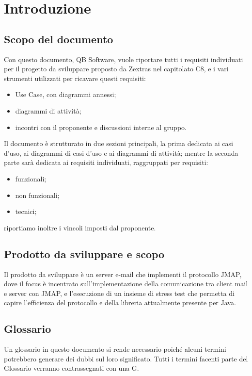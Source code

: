 \section{Introduzione}
    	\subsection{Scopo del documento}
            Con questo documento, QB Software, vuole riportare tutti i requisiti individuati per il progetto da sviluppare proposto da Zextras nel capitolato C8, e i vari strumenti utilizzati per ricavare questi requisiti:
            \begin{itemize}
                \item Use Case, con diagrammi annessi;
                \item diagrammi di attività;
                \item incontri con il proponente e discussioni interne al gruppo.
            \end{itemize} 
            Il documento è strutturato in due sezioni principali, la prima dedicata ai casi d'uso, ai diagrammi di casi d'uso e ai diagrammi di attività; mentre la seconda parte sarà dedicata ai requisiti individuati, raggruppati per requisiti:
            \begin{itemize}
                \item funzionali;
                \item non funzionali;
                \item tecnici;
            \end{itemize}
            riportiamo inoltre i vincoli imposti dal proponente.
    
    	\subsection{Prodotto da sviluppare e scopo}
            Il prodotto da sviluppare è un server e-mail che implementi il protocollo JMAP, dove il focus è incentrato sull'implementazione della comunicazione tra client mail e server con JMAP, e l'esecuzione di un insieme di stress test che permetta di capire l'efficienza del protocollo e della libreria attualmente presente per Java. %
    
    	\subsection{Glossario}
    		Un glossario in questo documento si rende necessario poiché alcuni termini potrebbero generare dei dubbi sul loro significato.
    		Tutti i termini facenti parte del Glossario verranno contrassegnati con una G.

